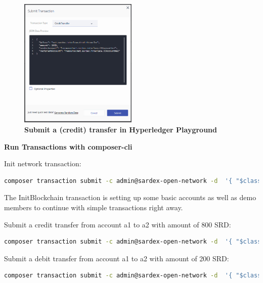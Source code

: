 \begin{figure}[htbp]
  \centering
  \includegraphics[width=0.5\textwidth]{Figures/submit-credit-transfer}
  \caption{\bf\small Submit a (credit) transfer in Hyperledger Playground}
  \label{fig:submit-credit-transfer}
\end{figure}


\textbf{Run Transactions with composer-cli}

Init network transaction:

\begin{lstlisting}[language=bash]
	composer transaction submit -c admin@sardex-open-network -d  '{ "$class": "net.sardex.interlace.InitBlockchain" }'
\end{lstlisting}

The InitBlockchain transaction is setting up some basic accounts as well as demo members to continue with simple transactions right away.

Submit a credit transfer from account a1 to a2 with amount of 800 SRD:

\begin{lstlisting}[language=bash]
	composer transaction submit -c admin@sardex-open-network -d  '{ "$class": "net.sardex.interlace.CreditTransfer", "amount": 800, "senderAccount": "resource:net.sardex.interlace.CCAccount#a1", "recipientAccount": "resource:net.sardex.interlace.CCAccount#a2" }'
\end{lstlisting}

Submit a debit transfer from account a1 to a2 with amount of 200 SRD:

\begin{lstlisting}[language=bash]
	composer transaction submit -c admin@sardex-open-network -d  '{ "$class": "net.sardex.interlace.DebitTransfer", "amount": 200, "senderAccount": "resource:net.sardex.interlace.CCAccount#a1", "recipientAccount": "resource:net.sardex.interlace.CCAccount#a2" }'
\end{lstlisting}

